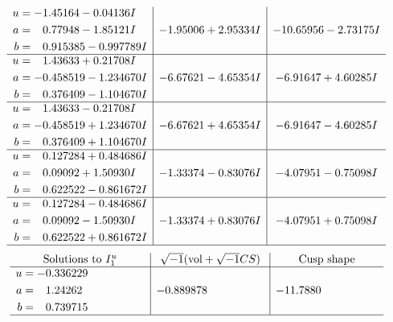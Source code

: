 \documentclass[1p]{elsarticle_modified}
\theoremstyle{definition}
\newcommand{\I}{\sqrt{-1}}
\begin{document}
$$\begin{array}{c|c|c}
\begin{aligned}
u &= -1.45164 - 0.04136 I \\
a &= \phantom{-}0.77948 - 1.85121 I \\
b &= \phantom{-}0.915385 - 0.997789 I\end{aligned}
 & -1.95006 + 2.95334 I & -10.65956 - 2.73175 I \\ \hline\begin{aligned}
u &= \phantom{-}1.43633 + 0.21708 I \\
a &= -0.458519 - 1.234670 I \\
b &= \phantom{-}0.376409 - 1.104670 I\end{aligned}
 & -6.67621 - 4.65354 I & -6.91647 + 4.60285 I \\ \hline\begin{aligned}
u &= \phantom{-}1.43633 - 0.21708 I \\
a &= -0.458519 + 1.234670 I \\
b &= \phantom{-}0.376409 + 1.104670 I\end{aligned}
 & -6.67621 + 4.65354 I & -6.91647 - 4.60285 I \\ \hline\begin{aligned}
u &= \phantom{-}0.127284 + 0.484686 I \\
a &= \phantom{-}0.09092 + 1.50930 I \\
b &= \phantom{-}0.622522 - 0.861672 I\end{aligned}
 & -1.33374 - 0.83076 I & -4.07951 - 0.75098 I \\ \hline\begin{aligned}
u &= \phantom{-}0.127284 - 0.484686 I \\
a &= \phantom{-}0.09092 - 1.50930 I \\
b &= \phantom{-}0.622522 + 0.861672 I\end{aligned}
 & -1.33374 + 0.83076 I & -4.07951 + 0.75098 I\\
 \hline 
 \end{array}$$\newpage$$\begin{array}{c|c|c}  
\text{Solutions to }I^u_{1}& \I (\text{vol} + \sqrt{-1}CS) & \text{Cusp shape}\\
 \hline 
\begin{aligned}
u &= -0.336229\phantom{ +0.000000I} \\
a &= \phantom{-}1.24262\phantom{ +0.000000I} \\
b &= \phantom{-}0.739715\phantom{ +0.000000I}\end{aligned}
 & -0.889878\phantom{ +0.000000I} & -11.7880\phantom{ +0.000000I}\\
 \hline 
 \end{array}$$\newpage\newpage\renewcommand{\arraystretch}{1}
\end{document}

